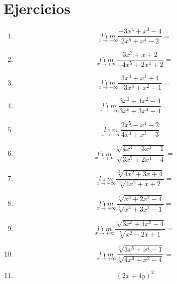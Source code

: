 \documentclass[oneside,spanish,letter]{article}
\begin{document}
\section{Ejercicios}
\begin{enumerate}
 \item $$\underset{x\rightarrow +\infty}{l\acute{\imath}m} \frac{-3x^4+x^3-4}{2x^5+x^4-2}=$$
 \item $$\underset{x\rightarrow +\infty}{l\acute{\imath}m} \frac{3x^2+x+2}{-4x^5+2x^4+2}=$$
 \item $$\underset{x\rightarrow +\infty}{l\acute{\imath}m} \frac{3x^4+x^3+4}{-3x^3+x^2-1}=$$
 \item $$\underset{x\rightarrow +\infty}{l\acute{\imath}m} \frac{3x^3+4x^2-4}{3x^5+3x^4-4}=$$
 \item $$\underset{x\rightarrow +\infty}{l\acute{\imath}m} \frac{2x^5-x^4-2}{4x^4+x^3-3}=$$
 \item $$\underset{x\rightarrow +\infty}{l\acute{\imath}m} \frac{\sqrt[4]{4x^4-3x^3-1}}{\sqrt[3]{3x^5+2x^4-4}}=$$
 \item $$\underset{x\rightarrow +\infty}{l\acute{\imath}m} \frac{\sqrt[3]{4x^2+3x+4}}{\sqrt[5]{4x^2+x+2}}=$$
 \item $$\underset{x\rightarrow +\infty}{l\acute{\imath}m} \frac{\sqrt[3]{x^3+2x^2-4}}{\sqrt[3]{x^3+3x^2-1}}=$$
 \item $$\underset{x\rightarrow +\infty}{l\acute{\imath}m} \frac{\sqrt[3]{3x^3+4x^2-4}}{\sqrt[5]{x^2-2x+1}}=$$
 \item $$\underset{x\rightarrow +\infty}{l\acute{\imath}m} \frac{\sqrt[5]{3x^5+x^4-1}}{\sqrt[3]{4x^3+x^2-4}}=$$
\item $$(2x+4y)^2$$
 \end{enumerate}
  \newpage
\end{document}
